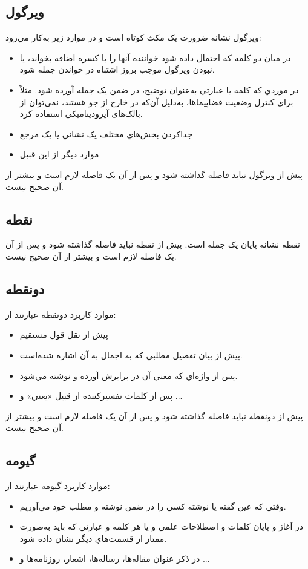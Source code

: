 \subsection{ويرگول}
ويرگول نشانه ضرورت یک مکث کوتاه است و در موارد زير به‌کار مي‌رود:
\begin{itemize}
\item
در ميان دو کلمه که احتمال داده شود خواننده آنها را با کسره اضافه بخواند، يا نبودن ويرگول موجب بروز اشتباه در خواندن جمله شود.
\item
در موردي که کلمه يا عبارتي به‌‌‌‌عنوان توضيح، در ضمن یک جمله آورده شود. مثلاً برای کنترل وضعیت فضاپیماها، به‌دلیل آن‌که در خارج از جو هستند، نمی‌توان از بالک‌های آیرودینامیکی استفاده کرد.
\item
جدا‌کردن بخش‌هاي مختلف يک نشاني يا یک مرجع
\item
موارد دیگر از این قبیل
\end{itemize}
پیش از ويرگول نبايد فاصله گذاشته شود و پس از آن يک فاصله لازم است و بيشتر از آن صحیح نیست.
\subsection{نقطه}
نقطه نشانه پایان یک جمله است. پیش از نقطه نبايد فاصله گذاشته شود و پس از آن يک فاصله لازم است و بيشتر از آن صحیح نیست.
\subsection{دونقطه}
موارد کاربرد دونقطه عبارتند از:
\begin{itemize}
\item
پيش از نقل قول مستقيم
\item
پيش از بيان تفصيل مطلبي که به اجمال به آن اشاره شده‌است.
\item
پس از واژه‌اي که معني آن در برابرش آورده و نوشته مي‌شود.
\item
پس از کلمات تفسير‌کننده از قبيل «يعني» و ...
\end{itemize}
پیش از دونقطه نبايد فاصله گذاشته شود و پس از آن يک فاصله لازم است و بيشتر از آن صحیح نیست.
\subsection{گیومه}
موارد کاربرد گیومه عبارتند از:
\begin{itemize}
\item
وقتي که عين گفته يا نوشته کسي را در ضمن نوشته و مطلب خود مي‌آوريم. 
\item
در آغاز و پايان کلمات و اصطلاحات علمي و يا هر کلمه و عبارتي که بايد به‌صورت ممتاز از قسمت‌هاي ديگر نشان داده شود.
\item
در ذکر عنوان مقاله‌ها، رساله‌ها، اشعار، روزنامه‌ها و ...
\end{itemize}
